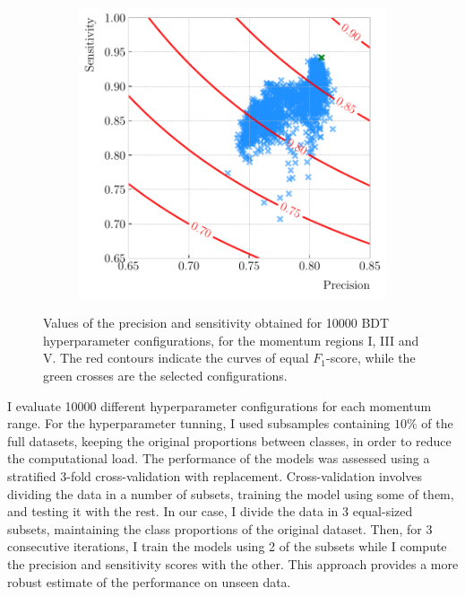 \begin{figure}[t]
\begin{subfigure}{0.32\textwidth}
	\end{subfigure}
	\begin{subfigure}{0.32\textwidth}
		\centering
		\includegraphics[width=.99\linewidth]{Images/GArSoft_PID/BDT/precision_vs_sensitivity_p0_6.50_sigmap_3.50.pdf}
	\end{subfigure}
	\caption[Values of the precision and sensitivity obtained for 10000 BDT hyperparameter configurations, for the momentum regions I, III and V.]{Values of the precision and sensitivity obtained for 10000 BDT hyperparameter configurations, for the momentum regions I, III and V. The red contours indicate the curves of equal $F_{1}$-score, while the green crosses are the selected configurations.}
	\label{fig:hyper_precision_sensitivity}
\end{figure}

I evaluate 10000 different hyperparameter configurations for each momentum range. For the hyperparameter tunning, I used subsamples containing $10\%$ of the full datasets, keeping the original proportions between classes, in order to reduce the computational load. The performance of the models was assessed using a stratified 3-fold cross-validation with replacement. Cross-validation involves dividing the data in a number of subsets, training the model using some of them, and testing it with the rest. In our case, I divide the data in 3 equal-sized subsets, maintaining the class proportions of the original dataset. Then, for 3 consecutive iterations, I train the models using 2 of the subsets while I compute the precision and sensitivity scores with the other. This approach provides a more robust estimate of the performance on unseen data.

